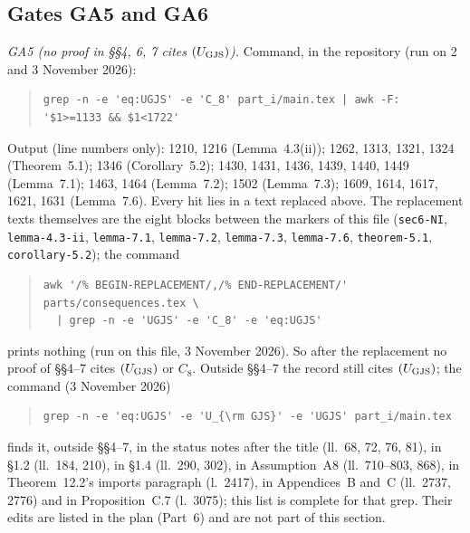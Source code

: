 \subsection{Gates GA5 and GA6}\label{sub:cons-gates}

\emph{GA5 (no proof in \S\S4, 6, 7 cites $(U_{\rm GJS})$).}  Command, in the repository (run on
2 and 3 November 2026):
\begin{quote}\footnotesize\begin{verbatim}
grep -n -e 'eq:UGJS' -e 'C_8' part_i/main.tex | awk -F: '$1>=1133 && $1<1722'
\end{verbatim}\end{quote}
Output (line numbers only): 1210, 1216 (Lemma~4.3(ii)); 1262, 1313, 1321, 1324 (Theorem~5.1);
1346 (Corollary~5.2); 1430, 1431, 1436, 1439, 1440, 1449 (Lemma~7.1); 1463, 1464 (Lemma~7.2); 1502
(Lemma~7.3); 1609, 1614, 1617, 1621, 1631 (Lemma~7.6).  Every hit lies in a text replaced above.
The replacement texts themselves are the eight blocks between the markers of this file
(\texttt{sec6-NI}, \texttt{lemma-4.3-ii}, \texttt{lemma-7.1}, \texttt{lemma-7.2},
\texttt{lemma-7.3}, \texttt{lemma-7.6}, \texttt{theorem-5.1}, \texttt{corollary-5.2}); the command
\begin{quote}\footnotesize\begin{verbatim}
awk '/% BEGIN-REPLACEMENT/,/% END-REPLACEMENT/' parts/consequences.tex \
  | grep -n -e 'UGJS' -e 'C_8' -e 'eq:UGJS'
\end{verbatim}\end{quote}
prints nothing (run on this file, 3 November 2026).  So after the replacement no proof of
\S\S4--7 cites $(U_{\rm GJS})$ or $C_8$.  Outside \S\S4--7 the record still cites $(U_{\rm GJS})$; the
command (3 November 2026)
\begin{quote}\footnotesize\begin{verbatim}
grep -n -e 'eq:UGJS' -e 'U_{\rm GJS}' -e 'UGJS' part_i/main.tex
\end{verbatim}\end{quote}
finds it, outside \S\S4--7, in the status notes after the title (ll.~68, 72, 76, 81), in \S1.2 (ll.~184, 210), in \S1.4 (ll.~290, 302), in
Assumption~A8 (ll.~710--803, 868), in Theorem~12.2's imports paragraph (l.~2417), in Appendices~B
and~C (ll.~2737, 2776) and in Proposition~C.7 (l.~3075); this list is complete for that grep.
Their edits are listed in the plan (Part~6) and are not part of this section.

